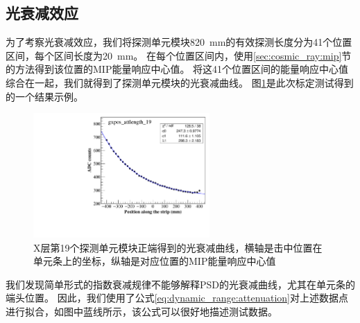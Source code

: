 \subsection{光衰减效应}
\label{sec:cosmic_ray:attenuation}
为了考察光衰减效应，我们将探测单元模块\SI{820}{mm}的有效探测长度分为41个位置区间，每个区间长度为\SI{20}{mm}。
在每个位置区间内，使用\ref{sec:cosmic_ray:mip}节的方法得到该位置的MIP能量响应中心值。
将这41个位置区间的能量响应中心值综合在一起，我们就得到了探测单元模块的光衰减曲线。
图\ref{fig:cosmic_ray:attenuation_example}是此次标定测试得到的一个结果示例。
\begin{figure}[htbp]
	\centering
	\includegraphics[width=0.60\textwidth]{chap/cosmic_ray/fig/attenuation_example.pdf}
	\caption{X层第19个探测单元模块正端得到的光衰减曲线，横轴是击中位置在单元条上的坐标，纵轴是对应位置的MIP能量响应中心值}
	\label{fig:cosmic_ray:attenuation_example}
\end{figure}
我们发现简单形式的指数衰减规律不能够解释PSD的光衰减曲线，尤其在单元条的端头位置。
因此，我们使用了公式\ref{eq:dynamic_range:attenuation}对上述数据点进行拟合，如图中蓝线所示，该公式可以很好地描述测试数据。

